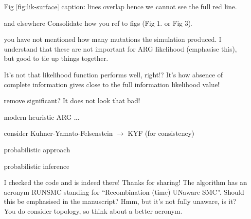 \reply{
}

\begin{point}{Fig \ref{fig:lik-surface} caption:}
 lines overlap hence we cannot see the full red line.
\end{point}

\reply{
}

\begin{point}{\revref{} and elsewhere} %
 Consolidate how you ref to figs (Fig 1. or Fig 3).
\end{point}

\reply{
}

\begin{point}{\revref} %
 you have not mentioned how many mutations the simulation produced. I understand that these are not important for ARG likelihood (emphasise this), but good to tie up things together.
\end{point}

\reply{
}

\begin{point}{\revref} %
 It's not that likelihood function performs well, right!? It's how absence of complete information gives close to the full information likelihood value!
\end{point}

\reply{
}

\begin{point}{\revref} %
 remove significant? It does not look that bad!
\end{point}

\reply{
}


\begin{point}{\revref} %
 modern heuristic ARG ...
\end{point}

\reply{
}

\begin{point}{\revref} %
 consider Kuhner-Yamato-Felsenstein $\to$ KYF (for consistency)
\end{point}

\reply{
}

\begin{point}{\revref} %
 probabilistic approach
\end{point}

\reply{
}

\begin{point}{\revref} %
 probabilistic inference
\end{point}

\reply{
}

\begin{point}{\revref} %
 I checked the code and is indeed there! Thanks for sharing! The algorithm has an acronym RUNSMC standing for ``Recombination (time) UNaware SMC''. Should this be emphasised in the manuscript? Hmm, but it's not fully unaware, is it? You do consider topology, so think about a better acronym.
\end{point}

\reply{
}


